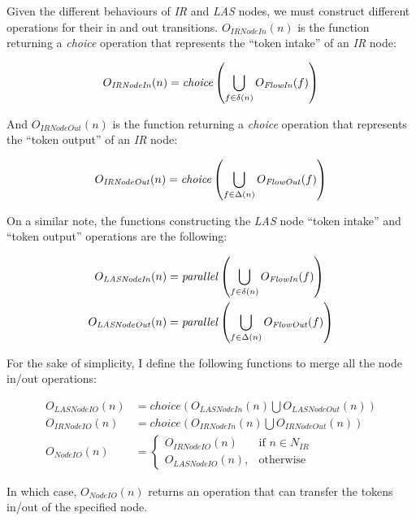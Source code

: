 \begin{definition}
	Given the different behaviours of \emph{IR} and \emph{LAS} nodes, we must construct different operations for their in and out transitions. \(O_\mathit{IRNodeIn}(n)\) is the function returning a \emph{choice} operation that represents the ``token intake'' of an \emph{IR} node:
	
	\begin{equation*}
		O_\mathit{IRNodeIn}(n) = \mathit{choice}\left(\bigcup_{f \in \delta(n)} O_\mathit{FlowIn}(f)\right)
	\end{equation*}
	
	And \(O_\mathit{IRNodeOut}(n)\) is the function returning a \emph{choice} operation that represents the ``token output'' of an \emph{IR} node:

	\begin{equation*}
		O_\mathit{IRNodeOut}(n) = \mathit{choice}\left(\bigcup_{f \in \Delta(n)} O_\mathit{FlowOut}(f)\right)
	\end{equation*}

	On a similar note, the functions constructing the \emph{LAS} node ``token intake'' and \enquote{token output} operations are the following:
	
	\begin{align*}
		O_\mathit{LASNodeIn}(n) &= \mathit{parallel}\left(\bigcup_{f \in \delta(n)} O_\mathit{FlowIn}(f)\right)\\
		O_\mathit{LASNodeOut}(n) &= \mathit{parallel}\left(\bigcup_{f \in \Delta(n)} O_\mathit{FlowOut}(f)\right)
	\end{align*}

	For the sake of simplicity, I define the following functions to merge all the node in/out operations:

	\begin{align*}
		O_\mathit{LASNodeIO}(n) &= \mathit{choice}\left(O_\mathit{LASNodeIn}(n) \bigcup O_\mathit{LASNodeOut}(n)\right)\\
		O_\mathit{IRNodeIO}(n) &= \mathit{choice}\left(O_\mathit{IRNodeIn}(n) \bigcup O_\mathit{IRNodeOut}(n)\right)\\
		O_\mathit{NodeIO}(n) &= 
		\begin{cases}
			O_\mathit{IRNodeIO}(n) & \text{if } n \in N_{IR} \\
			O_\mathit{LASNodeIO}(n), & \text{otherwise}
		\end{cases}
	\end{align*}

	In which case, \(O_\mathit{NodeIO}(n)\) returns an operation that can transfer the tokens in/out of the specified node. 

\end{definition}

